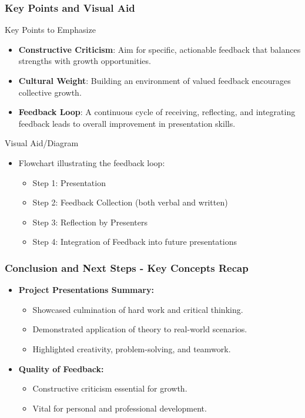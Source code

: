 \documentclass[aspectratio=169]{beamer}
\begin{document}
\begin{frame}[fragile]
    \frametitle{Key Points and Visual Aid}
    \begin{block}{Key Points to Emphasize}
        \begin{itemize}
            \item \textbf{Constructive Criticism}: Aim for specific, actionable feedback that balances strengths with growth opportunities.
            \item \textbf{Cultural Weight}: Building an environment of valued feedback encourages collective growth.
            \item \textbf{Feedback Loop}: A continuous cycle of receiving, reflecting, and integrating feedback leads to overall improvement in presentation skills.
        \end{itemize}
    \end{block}

    \begin{block}{Visual Aid/Diagram}
        \begin{itemize}
            \item Flowchart illustrating the feedback loop:
                \begin{itemize}
                    \item Step 1: Presentation
                    \item Step 2: Feedback Collection (both verbal and written)
                    \item Step 3: Reflection by Presenters
                    \item Step 4: Integration of Feedback into future presentations
                \end{itemize}
        \end{itemize}
    \end{block}
\end{frame}

\begin{frame}[fragile]
    \frametitle{Conclusion and Next Steps - Key Concepts Recap}
    \begin{itemize}
        \item \textbf{Project Presentations Summary:}
        \begin{itemize}
            \item Showcased culmination of hard work and critical thinking.
            \item Demonstrated application of theory to real-world scenarios.
            \item Highlighted creativity, problem-solving, and teamwork.
        \end{itemize}

        \item \textbf{Quality of Feedback:}
        \begin{itemize}
            \item Constructive criticism essential for growth.
            \item Vital for personal and professional development.
        \end{itemize}
    \end{itemize}
\end{frame}
\end{document}
